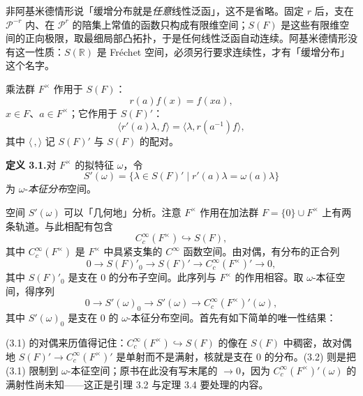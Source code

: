 \begin{annote}
非阿基米德情形说「缓增分布就是\emph{任意}线性泛函」，这不是省略。固定 $r$ 后，支在 $\mathcal P^{-r}$ 内、在 $\mathcal P^r$ 的陪集上常值的函数只构成有限维空间；$S(F)$ 是这些有限维空间的正向极限，取最细局部凸拓扑，于是任何线性泛函自动连续。阿基米德情形没有这一性质：$S(\mathbb R)$ 是 Fr\'echet 空间，必须另行要求连续性，才有「缓增分布」这个名字。
\par\vspace{0.15em}{\raggedleft 【来源：Friedlander《Introduction to the Theory of Distributions》；Tate 论文 §2（A）】\par}
\end{annote}

乘法群 $F^\times$ 作用于 $S(F)$：
\[
r(a)f(x)=f(xa),
\]
$x\in F$、$a\in F^\times$；它作用于 $S(F)'$：
\[
\langle r'(a)\lambda,f\rangle=\langle\lambda,r(a^{-1})f\rangle,
\]
其中 $\langle\,,\rangle$ 记 $S(F)'$ 与 $S(F)$ 的配对。

\medskip\noindent\textbf{定义 3.1.}\quad 对 $F^\times$ 的拟特征 $\omega$，令
\[
S'(\omega)=\{\lambda\in S(F)'\mid r'(a)\lambda=\omega(a)\lambda\}
\]
为 $\omega$-\emph{本征分布}空间。

空间 $S'(\omega)$ 可以「几何地」分析。注意 $F^\times$ 作用在加法群 $F=\{0\}\cup F^\times$ 上有两条轨道。与此相配有包含
\[
C_c^\infty(F^\times)\hookrightarrow S(F),
\]
其中 $C_c^\infty(F^\times)$ 是 $F^\times$ 中具紧支集的 $C^\infty$ 函数空间。由对偶，有分布的正合列
\begin{equation*}\tag{3.1}
0\longrightarrow S(F)'_0\longrightarrow S(F)'\longrightarrow C_c^\infty(F^\times)'\longrightarrow 0,
\end{equation*}
其中 $S(F)'_0$ 是支在 $0$ 的分布子空间。此序列与 $F^\times$ 的作用相容。取 $\omega$-本征空间，得序列
\begin{equation*}\tag{3.2}
0\longrightarrow S'(\omega)_0\longrightarrow S'(\omega)\longrightarrow C_c^\infty(F^\times)'(\omega),
\end{equation*}
其中 $S'(\omega)_0$ 是支在 $0$ 的 $\omega$-本征分布空间。首先有如下简单的唯一性结果：

\begin{annote}
(3.1) 的对偶来历值得记住：$C_c^\infty(F^\times)\hookrightarrow S(F)$ 的像在 $S(F)$ 中稠密，故对偶地 $S(F)'\to C_c^\infty(F^\times)'$ 是单射而不是满射，核就是支在 $0$ 的分布。(3.2) 则是把 (3.1) 限制到 $\omega$-本征空间；原书在此没有写末尾的 $\to0$，因为 $C_c^\infty(F^\times)'(\omega)$ 的满射性尚未知——这正是引理 3.2 与定理 3.4 要处理的内容。
\par\vspace{0.15em}{\raggedleft 【来源：Tate 论文 §2；Bump 3.1（A）】\par}
\end{annote}

